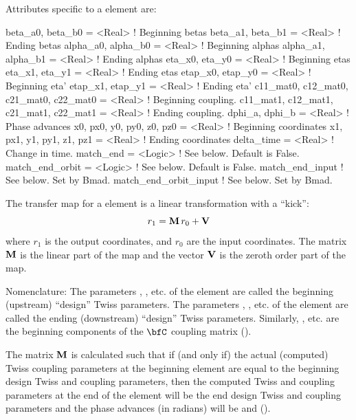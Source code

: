 {Attributes specific to a  element are:
\begin{example}
  beta_a0, beta_b0   = <Real>                      ! Beginning betas
  beta_a1, beta_b1   = <Real>                      ! Ending betas
  alpha_a0, alpha_b0 = <Real>                      ! Beginning alphas
  alpha_a1, alpha_b1 = <Real>                      ! Ending alphas
  eta_x0, eta_y0     = <Real>                      ! Beginning etas 
  eta_x1, eta_y1     = <Real>                      ! Ending etas 
  etap_x0, etap_y0   = <Real>                      ! Beginning eta' 
  etap_x1, etap_y1   = <Real>                      ! Ending eta'
  c11_mat0, c12_mat0, c21_mat0, c22_mat0 = <Real>  ! Beginning coupling.
  c11_mat1, c12_mat1, c21_mat1, c22_mat1 = <Real>  ! Ending coupling.
  dphi_a, dphi_b     = <Real>                      ! Phase advances
  x0, px0, y0, py0, z0, pz0 = <Real>               ! Beginning coordinates
  x1, px1, y1, py1, z1, pz1 = <Real>               ! Ending coordinates
  delta_time  = <Real>                             ! Change in time.
  match_end = <Logic>                              ! See below. Default is False.
  match_end_orbit = <Logic>                        ! See below. Default is False.
  match_end_input                                  ! See below. Set by Bmad.
  match_end_orbit_input                            ! See below. Set by Bmad. 
\end{example}

The transfer map for a  element is a linear transformation 
with a ``kick'':
\begin{equation}
  r_1 = {\bf M} \, r_0 + {\bf V} 
\end{equation}
where $r_1$ is the output coordinates, and $r_0$ are the input
coordinates. The matrix ${\bf M}$ is the linear part of the map and the
vector ${\bf V}$ is the zeroth order part of the map.

Nomenclature: The parameters , , etc. of the
 element are called the beginning (upstream) ``design''
Twiss parameters. The parameters , , etc. of
the  element are called the ending (downstream) ``design'' Twiss
parameters. Similarly, , etc. are the beginning components of the
$\bfC$ coupling matrix ().

The matrix ${\bf M}$ is calculated such that if (and only if) the actual (computed) Twiss coupling
parameters at the beginning  element are equal to the beginning design Twiss and coupling
parameters, then the computed Twiss and coupling parameters at the end of the  element
will be the end design Twiss and coupling parameters and the phase advances (in radians) will be
 and  ().

}
